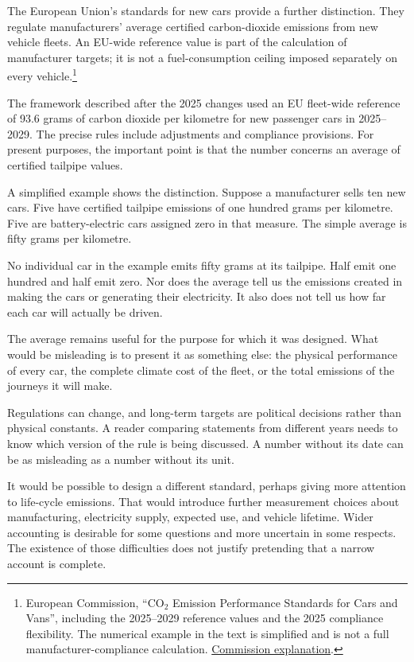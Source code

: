 \documentclass[12pt,a4paper]{book}
\begin{document}
The European Union's standards for new cars provide a further distinction. They regulate manufacturers' average certified carbon-dioxide emissions from new vehicle fleets. An EU-wide reference value is part of the calculation of manufacturer targets; it is not a fuel-consumption ceiling imposed separately on every vehicle.\footnote{European Commission, ``CO$_2$ Emission Performance Standards for Cars and Vans'', including the 2025--2029 reference values and the 2025 compliance flexibility. The numerical example in the text is simplified and is not a full manufacturer-compliance calculation. \href{https://climate.ec.europa.eu/eu-action/transport/road-transport-reducing-co2-emissions-vehicles/co2-emission-performance-standards-cars-and-vans_en}{Commission explanation}.}

The framework described after the 2025 changes used an EU fleet-wide reference of 93.6 grams of carbon dioxide per kilometre for new passenger cars in 2025--2029. The precise rules include adjustments and compliance provisions. For present purposes, the important point is that the number concerns an average of certified tailpipe values.

A simplified example shows the distinction. Suppose a manufacturer sells ten new cars. Five have certified tailpipe emissions of one hundred grams per kilometre. Five are battery-electric cars assigned zero in that measure. The simple average is fifty grams per kilometre.

No individual car in the example emits fifty grams at its tailpipe. Half emit one hundred and half emit zero. Nor does the average tell us the emissions created in making the cars or generating their electricity. It also does not tell us how far each car will actually be driven.

The average remains useful for the purpose for which it was designed. What would be misleading is to present it as something else: the physical performance of every car, the complete climate cost of the fleet, or the total emissions of the journeys it will make.

Regulations can change, and long-term targets are political decisions rather than physical constants. A reader comparing statements from different years needs to know which version of the rule is being discussed. A number without its date can be as misleading as a number without its unit.

It would be possible to design a different standard, perhaps giving more attention to life-cycle emissions. That would introduce further measurement choices about manufacturing, electricity supply, expected use, and vehicle lifetime. Wider accounting is desirable for some questions and more uncertain in some respects. The existence of those difficulties does not justify pretending that a narrow account is complete.
\end{document}
